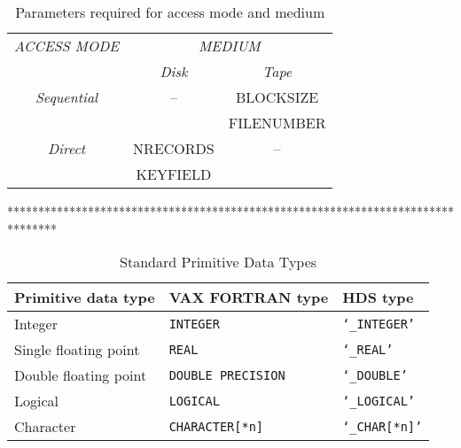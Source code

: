\begin{table}[h]
\begin{center}
\begin{tabular}{||c|c|c||} \hline
{\em ACCESS MODE} & \multicolumn{2}{c||}{{\em MEDIUM}} \\ \cline{2-3}
& {\em Disk} & {\em Tape} \\ \hline
{\em Sequential} & -- & BLOCKSIZE \\
& & FILENUMBER \\ \hline
{\em Direct} & NRECORDS & -- \\
& KEYFIELD & \\ \hline
\end{tabular}
\caption {Parameters required for access mode and medium}
\end{center}
\end {table}

********************************************************************************

\begin {table}[h]
\begin {center}
\begin {tabular}{||l|l|l||}
\hline
Primitive data type	& VAX FORTRAN type		& HDS type \\
\hline
Integer			& {\tt INTEGER}			& {\tt `\_INTEGER'} \\
Single floating point	& {\tt REAL}			& {\tt `\_REAL'} \\
Double floating point	& {\tt DOUBLE PRECISION}	& {\tt `\_DOUBLE'} \\
Logical			& {\tt LOGICAL}			& {\tt `\_LOGICAL'} \\
Character		& {\tt CHARACTER[*n]}		& {\tt `\_CHAR[*n]'} \\
\hline
\end {tabular}
\caption {Standard Primitive Data Types}
\end {center}
\end {table}

\newpage

